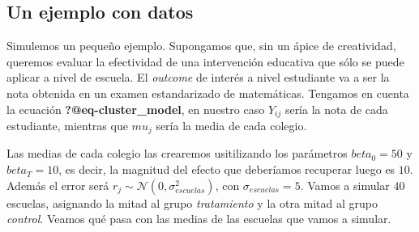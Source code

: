 \documentclass[
  letterpaper,
  DIV=11,
  numbers=noendperiod,
  oneside]{scrreprt}
\begin{document}
\hypertarget{un-ejemplo-con-datos}{%
\subsection{Un ejemplo con datos}\label{un-ejemplo-con-datos}}

Simulemos un pequeño ejemplo. Supongamos que, sin un ápice de
creatividad, queremos evaluar la efectividad de una intervención
educativa que sólo se puede aplicar a nivel de escuela. El
\emph{outcome} de interés a nivel estudiante va a ser la nota obtenida
en un examen estandarizado de matemáticas. Tengamos en cuenta la
ecuación \textbf{?@eq-cluster\_model}, en nuestro caso \(Y_{ij}\) sería
la nota de cada estudiante, mientras que \(mu_j\) sería la media de cada
colegio.

Las medias de cada colegio las crearemos usitilizando los parámetros
\(beta_0 = 50\) y \(beta_T = 10\), es decir, la magnitud del efecto que
deberíamos recuperar luego es \(10\). Además el error será
\(r_j \sim \mathcal{N}(0, \sigma_{escuelas}^2)\), con
\(\sigma_{escuelas} = 5\). Vamos a simular \(40\) escuelas, asignando la
mitad al grupo \emph{tratamiento} y la otra mitad al grupo
\emph{control}. Veamos qué pasa con las medias de las escuelas que vamos
a simular.
\end{document}
